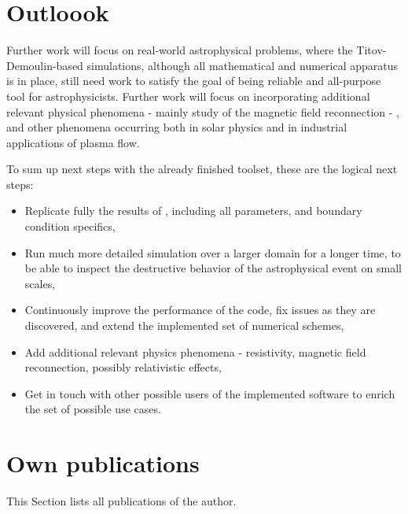 \section*{Outloook}
Further work will focus on real-world astrophysical problems, where the Titov-Demoulin-based simulations, although all mathematical and numerical apparatus is in place, still need work to satisfy the goal of being reliable and all-purpose tool for astrophysicists. Further work will focus on incorporating additional relevant physical phenomena - mainly study of the magnetic field reconnection - \citep{reconnection}, and other phenomena occurring both in solar physics and in industrial applications of plasma flow.

To sum up next steps with the already finished toolset, these are the logical next steps:
\begin{itemize}
\item Replicate fully the results of \cite{miraClanek}, including all parameters, and boundary condition specifics,
\item Run much more detailed simulation over a larger domain for a longer time, to be able to inspect the destructive behavior of the astrophysical event on small scales,
\item Continuously improve the performance of the code, fix issues as they are discovered, and extend the implemented set of numerical schemes,
\item Add additional relevant physics phenomena - resistivity, magnetic field reconnection, possibly relativistic effects,
\item Get in touch with other possible users of the implemented software to enrich the set of possible use cases.
\end{itemize}

\newpage
\section*{Own publications}
This Section lists all publications of the author.
